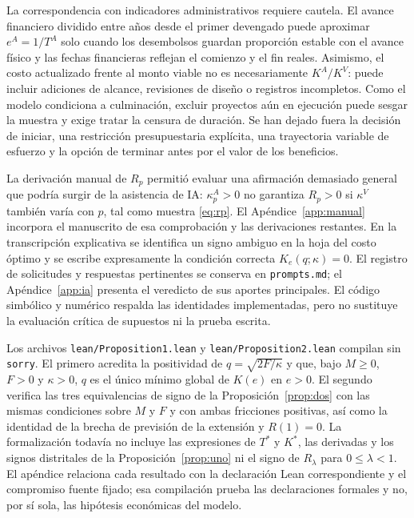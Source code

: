 \documentclass[11pt]{article}
\newcommand{\KA}{K^{A}}
\newcommand{\KV}{K^{V}}
\begin{document}
La correspondencia con indicadores administrativos requiere cautela. El avance financiero dividido entre años desde el primer devengado puede aproximar $e^A=1/T^A$ solo cuando los desembolsos guardan proporción estable con el avance físico y las fechas financieras reflejan el comienzo y el fin reales. Asimismo, el costo actualizado frente al monto viable no es necesariamente $\KA/\KV$: puede incluir adiciones de alcance, revisiones de diseño o registros incompletos. Como el modelo condiciona a culminación, excluir proyectos aún en ejecución puede sesgar la muestra y exige tratar la censura de duración. Se han dejado fuera la decisión de iniciar, una restricción presupuestaria explícita, una trayectoria variable de esfuerzo y la opción de terminar antes por el valor de los beneficios.

La derivación manual de $R_p$ permitió evaluar una afirmación demasiado general que podría surgir de la asistencia de IA: $\kappa_p^A>0$ no garantiza $R_p>0$ si $\kappa^V$ también varía con $p$, tal como muestra \eqref{eq:rp}. El Apéndice~\ref{app:manual} incorpora el manuscrito de esa comprobación y las derivaciones restantes. En la transcripción explicativa se identifica un signo ambiguo en la hoja del costo óptimo y se escribe expresamente la condición correcta $K_e(q;\kappa)=0$. El registro de solicitudes y respuestas pertinentes se conserva en \texttt{prompts.md}; el Apéndice~\ref{app:ia} presenta el veredicto de sus aportes principales. El código simbólico y numérico respalda las identidades implementadas, pero no sustituye la evaluación crítica de supuestos ni la prueba escrita.

Los archivos \texttt{lean/Proposition1.lean} y \texttt{lean/Proposition2.lean} compilan sin \texttt{sorry}. El primero acredita la positividad de $q=\sqrt{2F/\kappa}$ y que, bajo $M\geq0$, $F>0$ y $\kappa>0$, $q$ es el único mínimo global de $K(e)$ en $e>0$. El segundo verifica las tres equivalencias de signo de la Proposición~\ref{prop:dos} con las mismas condiciones sobre $M$ y $F$ y con ambas fricciones positivas, así como la identidad de la brecha de previsión de la extensión y $R(1)=0$. La formalización todavía no incluye las expresiones de $T^*$ y $K^*$, las derivadas y los signos distritales de la Proposición~\ref{prop:uno} ni el signo de $R_\lambda$ para $0\leq\lambda<1$. El apéndice relaciona cada resultado con la declaración Lean correspondiente y el compromiso fuente fijado; esa compilación prueba las declaraciones formales y no, por sí sola, las hipótesis económicas del modelo.
\end{document}
